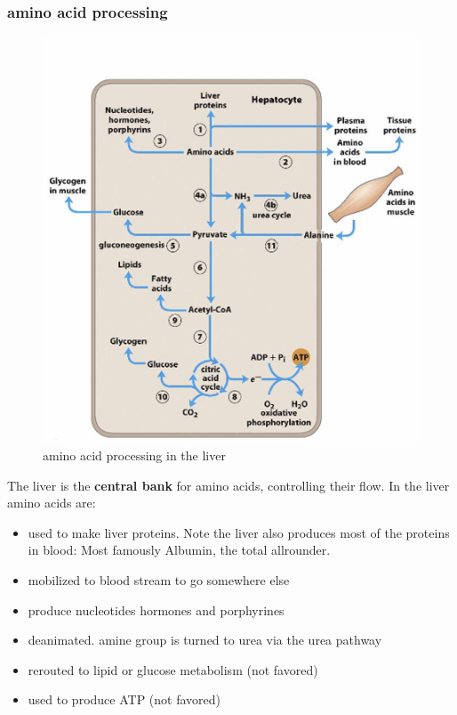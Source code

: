 \documentclass[../main.tex]{subfiles}
\begin{document}
\subsubsection{amino acid processing}
\begin{figure}[H]
    \centering
    \includegraphics[width=0.5\linewidth]{liverAminoAcid.png}
    \caption{amino acid processing in the liver}
    \label{fig:enter-label}
\end{figure}
The liver is the \textbf{central bank} for amino acids, controlling their flow. In the liver amino acids are: 
\begin{itemize}
    \item used to make liver proteins. Note the liver also produces most of the proteins in blood: Most famously Albumin, the total allrounder. 
    \item mobilized to blood stream to go somewhere else
    \item produce nucleotides hormones 
    and porphyrines 
    \item deanimated. amine group is turned to urea via the urea pathway
    \item rerouted to lipid or glucose metabolism (not favored)
    \item used to produce ATP (not favored)
\end{itemize}
\end{document}
